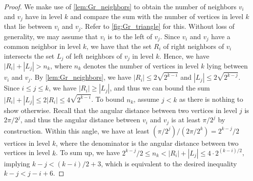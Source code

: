 \documentclass[11pt]{article}
\begin{document}
\begin{proof}
    We make use of \cref{lem:Gr_neighbors} to obtain the number of neighbors $ v_i $ and $ v_j $ have in level $ k $ and compare the sum with the number of vertices in level $ k $ that lie between $ v_i $ and $ v_j $.
    Refer to \cref{fig:Gr_triangle} for this.
    Without loss of generality, we may assume that $ v_i $ is to the left of $ v_j $.
    Since $ v_i $ and $ v_j $ have a common neighbor in level $ k $, we have that the set $R_i$ of right neighbors of $ v_i $ intersects the set $L_j$ of left neighbors of $ v_j $ in level $ k $.
    Hence, we have $ |R_i| + |L_j| > n_k $, where $n_k$ denotes the number of vertices in level $ k $ lying between $ v_i $ and $ v_j $.
%
    By \cref{lem:Gr_neighbors}, we have $ |R_i| \leq 2 \sqrt{2^{k-i}} $ and $ |L_j| \leq 2 \sqrt{2^{k-j}} $.
    Since $ i \leq j \leq k $, we have $ |R_i| \geq |L_j| $, and thus we can bound the sum $ |R_i| + |L_j| \leq 2 |R_i| \leq 4 \sqrt{2^{k-i}} $.
%
    To bound $ n_k $, assume $ j < k $ as there is nothing to show otherwise.
    Recall that the angular distance between two vertices in level $ j $ is $ 2\pi / 2^j $, and thus the angular distance between $ v_i $ and $ v_j $ is at least $ \pi / 2^j $ by construction.
    Within this angle, we have at least $ (\pi / 2^j) / (2\pi / 2^k) = 2^{k-j}/2 $ vertices in level $ k $, where the denominator is the angular distance between two vertices in level $ k $.
%
    To sum up, we have 
    $ 2^{k-j}/2 \leq n_k < |R_i| + |L_j| \leq 4 \cdot 2^{(k-i)/2} $,
    implying $ k - j < (k - i)/2 + 3 $, which is equivalent to the desired inequality $ k - j < j - i + 6 $.
\end{proof}
%
%
\end{document}

